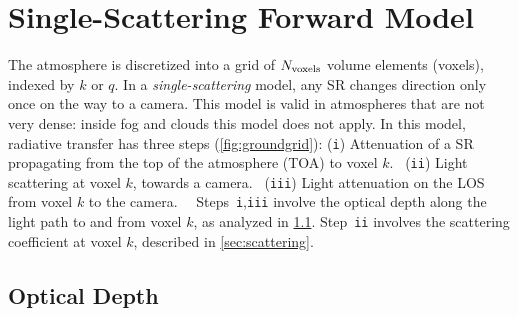 \documentclass[10pt,letterpaper]{article}
\begin{document}
\section{Single-Scattering Forward Model}
\label{sec:single-scatt-model}

The atmosphere is discretized into a grid of $N_{\rm voxels}$ volume
elements (voxels), indexed by $k$ or $q$. In a
\emph{single-scattering} model, any SR changes direction only once on
the way to a camera. This model is valid in atmospheres that are not
very dense: inside fog and clouds this model does not apply. In this
model, radiative transfer has three steps (\cref{fig:groundgrid}):
({\tt i}) Attenuation of a SR propagating from the top of the
atmosphere (TOA) to voxel $k$. ~({\tt ii}) Light scattering at voxel
$k$, towards a camera. ~({\tt iii}) Light attenuation on the LOS from
voxel $k$ to the camera.~~ Steps~{\tt i},{\tt iii} involve the optical
depth along the light path to and from voxel $k$, as analyzed in
\cref{sec:optical-depth}.  Step~{\tt ii} involves the scattering
coefficient at voxel $k$, described in \cref{sec:scattering}.


\subsection{Optical Depth}
\label{sec:optical-depth}
\end{document}
